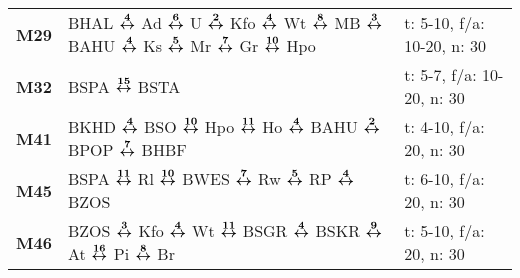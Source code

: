 \begin{minipage}[t]{0.45\textwidth}
\begin{tabular}{>{\bfseries}L{1.2cm}L{9.0cm}L{3.0cm}}
\mbus{} M29   & BHAL $\xarwe{4}$ Ad $\xarwe{6}$ U $\xarwe{2}$ Kfo $\xarwe{4}$ Wt $\xarwe{8}$ MB $\xarwe{3}$ BAHU $\xarwe{4}$ Ks $\xarwe{5}$ Mr $\xarwe{7}$ Gr $\xarwe{10}$ Hpo      & t: 5-10, f/a: 10-20, n: 30 \\
\mbus{} M32   & BSPA $\xarwe{15}$ BSTA                                                                                                                                              & t: 5-7, f/a: 10-20, n: 30  \\
\mbus{} M41   & BKHD $\xarwe{4}$ BSO $\xarwe{10}$ Hpo $\xarwe{11}$ Ho $\xarwe{4}$ BAHU $\xarwe{2}$ BPOP $\xarwe{7}$ BHBF                                                            & t: 4-10, f/a: 20, n: 30    \\
\mbus{} M45   & BSPA $\xarwe{11}$ Rl $\xarwe{10}$ BWES $\xarwe{7}$ Rw $\xarwe{5}$ RP $\xarwe{4}$ BZOS                                                                               & t: 6-10, f/a: 20, n: 30    \\
\mbus{} M46   & BZOS $\xarwe{3}$ Kfo $\xarwe{4}$ Wt $\xarwe{11}$ BSGR $\xarwe{4}$ BSKR $\xarwe{9}$ At $\xarwe{16}$ Pi $\xarwe{8}$ Br                                                & t: 5-10, f/a: 20, n: 30    \\
\hline
\end{tabular}
\end{minipage}
\begin{minipage}[t]{0.05\textwidth}
\phantom{Tor}
\end{minipage}

